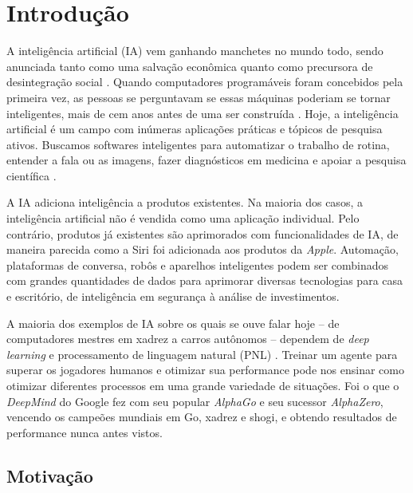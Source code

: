 \chapter{Introdução}
\label{chap:intro}

A inteligência artificial (IA) vem ganhando manchetes no mundo todo, sendo anunciada tanto como uma salvação econômica quanto como precursora de desintegração social \cite{robu-valentin-flyn:ethical-social-challenges-ai}. Quando computadores programáveis foram concebidos pela primeira vez, as pessoas se perguntavam se essas máquinas poderiam se tornar inteligentes, mais de cem anos antes de uma ser construída %
\cite{menabrea1843sketch}.
 Hoje, a inteligência artificial é um campo com inúmeras aplicações práticas e tópicos de pesquisa ativos. Buscamos softwares inteligentes para automatizar o trabalho de rotina, entender a fala ou as imagens, fazer diagnósticos em medicina e apoiar a pesquisa científica \cite{Goodfellow-et-al-2016}.


A IA adiciona inteligência a produtos existentes. Na maioria dos casos, a inteligência artificial não é vendida como uma aplicação individual. Pelo contrário, produtos já existentes são aprimorados com funcionalidades de IA, de maneira parecida como a Siri foi adicionada aos produtos da \textit{Apple}. Automação, plataformas de conversa, robôs e aparelhos inteligentes podem ser combinados com grandes quantidades de dados para aprimorar diversas tecnologias para casa e escritório, de inteligência em segurança à análise de investimentos.

A maioria dos exemplos de IA sobre os quais se ouve falar hoje – de computadores mestres em xadrez a carros autônomos – dependem de \textit{deep learning} e processamento de linguagem natural (PNL) \cite{pln-o-que-e}. Treinar um agente para superar os jogadores humanos e otimizar sua performance pode nos ensinar como otimizar diferentes processos em uma grande variedade de situações. Foi o que o \textit{DeepMind} do Google fez com seu popular \textit{AlphaGo} e seu sucessor \textit{AlphaZero}, vencendo os campeões mundiais em Go, xadrez e shogi, e obtendo resultados de performance nunca antes vistos.

\section{Motivação}

